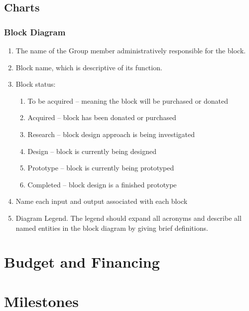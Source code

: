 \documentclass[a4paper,10pt]{article}
\begin{document}
	\subsection{Charts}
	\subsubsection{Block Diagram}
	
	\begin{enumerate}
		\item The name of the Group member administratively responsible for the block.
		\item Block name, which is descriptive of its function.
		\item Block status:
		\begin{enumerate}
			\item To be acquired – meaning the block will be purchased or donated
			\item Acquired – block has been donated or purchased
			\item Research – block design approach is being investigated
			\item Design – block is currently being designed
			\item Prototype – block is currently being prototyped
			\item Completed – block design is a finished prototype
		\end{enumerate}
		\item Name each input and output associated with each block
		\item Diagram Legend. The legend should expand all acronyms and describe all named entities in the block diagram by giving brief definitions.
	\end{enumerate}
	\section{Budget and Financing}
	\section{Milestones}
\end{document}
